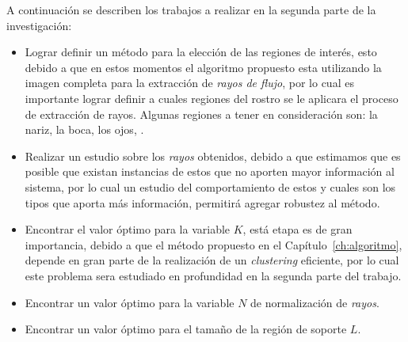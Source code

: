 A continuación se describen los trabajos a realizar en la segunda parte de la investigación:

\begin{itemize}
	\item Lograr definir un método para la elección de las regiones de interés, esto debido a que en estos momentos el algoritmo propuesto esta utilizando la imagen completa para la extracción de \textit{rayos de flujo}, por lo cual es importante lograr definir a cuales regiones del rostro se le aplicara el proceso de extracción de rayos. Algunas regiones a tener en consideración son: la nariz, la boca, los ojos, \etc.
	
	\item Realizar un estudio sobre los \textit{rayos} obtenidos, debido a que estimamos que es posible que existan instancias de estos que no aporten mayor información al sistema, por lo cual un estudio del comportamiento de estos y cuales son los tipos que aporta más información, permitirá agregar robustez al método.
	
	\item Encontrar el valor óptimo para la variable $K$, está etapa es de gran importancia, debido a que el método propuesto en el Capítulo~\ref{ch:algoritmo}, depende en gran parte de la realización de un \textit{clustering} eficiente, por lo cual este problema sera estudiado en profundidad en la segunda parte del trabajo.
	
	\item Encontrar un valor óptimo para la variable $N$ de normalización de \textit{rayos}.
		
	\item Encontrar un valor óptimo para el tamaño de la región de soporte $L$.
\end{itemize}
